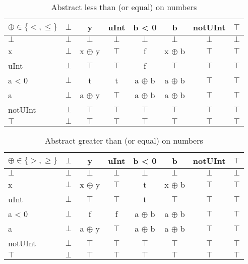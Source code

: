 \begin{table}[htbp]
\centering
\begin{tabular}{l|ccccccc}
$\oplus\in\{<, \leq\}$     & $\bot$ & y      & uInt   & b < 0  & b      & notUInt & $\top$ \\\hline
$\bot$  & $\bot$ & $\bot$ & $\bot$ & $\bot$ & $\bot$ & $\bot$  & $\bot$ \\
x       & $\bot$ & x $\oplus$ y  & $\top$ & f      & x $\oplus$ b  & $\top$  & $\top$ \\
uInt    & $\bot$ & $\top$ & $\top$ & f      & $\top$ & $\top$  & $\top$ \\
a < 0   & $\bot$ & t      & t      & a $\oplus$ b  & a $\oplus$ b  & $\top$  & $\top$ \\
a       & $\bot$ & a $\oplus$ y  & $\top$ & a $\oplus$ b  & a $\oplus$ b  & $\top$  & $\top$ \\
notUInt & $\bot$ & $\top$ & $\top$ & $\top$ & $\top$ & $\top$  & $\top$ \\
$\top$  & $\bot$ & $\top$ & $\top$ & $\top$ & $\top$ & $\top$  & $\top$
\end{tabular}
\caption{Abstract less than (or equal) on numbers}
\label{tab:abstract_less_than_equal_number}
\end{table}

\clearpage

\begin{table}[htbp]
\centering
\begin{tabular}{l|ccccccc}
$\oplus\in\{>, \geq\}$     & $\bot$ & y      & uInt   & b < 0  & b      & notUInt & $\top$ \\\hline
$\bot$  & $\bot$ & $\bot$ & $\bot$ & $\bot$ & $\bot$ & $\bot$  & $\bot$ \\
x       & $\bot$ & x $\oplus$ y  & $\top$ & t      & x $\oplus$ b  & $\top$  & $\top$ \\
uInt    & $\bot$ & $\top$ & $\top$ & t      & $\top$ & $\top$  & $\top$ \\
a < 0   & $\bot$ & f      & f      & a $\oplus$ b  & a $\oplus$ b  & $\top$  & $\top$ \\
a       & $\bot$ & a $\oplus$ y  & $\top$ & a $\oplus$ b  & a $\oplus$ b  & $\top$  & $\top$ \\
notUInt & $\bot$ & $\top$ & $\top$ & $\top$ & $\top$ & $\top$  & $\top$ \\
$\top$  & $\bot$ & $\top$ & $\top$ & $\top$ & $\top$ & $\top$  & $\top$
\end{tabular}
\caption{Abstract greater than (or equal) on numbers}
\label{tab:abstract_greater_than_equal_number}
\end{table}

